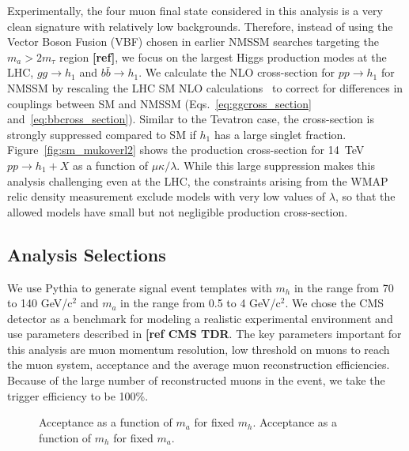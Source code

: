 \documentclass[aps,prl,nofootinbib,superscriptaddress]{revtex4}
\begin{document}
Experimentally, the four muon final state considered in this analysis is a very clean signature 
with relatively low backgrounds. Therefore, instead of using the Vector Boson Fusion (VBF)
chosen in earlier NMSSM searches targeting the $m_a>2 m_\tau$ region {\bf [ref]}, we focus on the largest 
Higgs production modes at the LHC, $gg \to h_1$ and $b\bar{b} \to h_1$.  We calculate the NLO 
cross-section for $pp \to h_1$ for NMSSM by rescaling the LHC SM NLO calculations~\cite{Spira:1995rr,Balazs:1998sb} 
to correct for differences in couplings between SM and NMSSM (Eqs.~\ref{eq:ggcross_section} and~\ref{eq:bbcross_section}). 
Similar to the Tevatron case, the cross-section is strongly suppressed compared to SM if $h_1$ 
has a large singlet fraction. Figure~\ref{fig:sm_mukoverl2} shows the production cross-section for 14~TeV $pp \to h_1+X$ 
as a function of $\mu\kappa/\lambda$.  While this large suppression makes this analysis challenging even at the LHC,
the constraints arising from the WMAP relic density measurement exclude models with very low values of $\lambda$, so
that the allowed models have small but not negligible production cross-section.

\subsection{Analysis Selections}
We use Pythia to generate signal event templates with $m_h$ in the range from 70 to 140 GeV/c$^2$
and $m_a$  in the range from 0.5 to 4 GeV/c$^2$. We chose the CMS detector as a benchmark for modeling
a realistic experimental environment and use parameters described in {\bf [ref CMS TDR}. The key 
parameters important for this analysis are muon momentum resolution, low threshold on muons to 
reach the muon system, acceptance and the average muon reconstruction efficiencies. Because of the
large number of reconstructed muons in the event, we take the trigger efficiency to be 100\%.

\begin{figure*}[htbp]
\begin{center}
\caption{Acceptance as a function of $m_a$ for fixed $m_h$. Acceptance as a function of $m_h$ for fixed $m_a$.}
\label{signal_acceptance}
\end{center}
\end{figure*}
\end{document}

